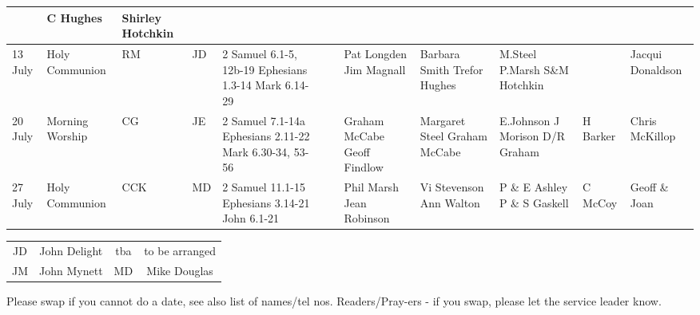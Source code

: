 \documentclass[10pt,a4paper]{article}
\begin{document}
\begin{center}
{\begin{tabular}{|p{1.6cm}|p{1.4cm}|p{1.0cm}|p{0.8cm}|p{3.2cm}|p{2cm}|p{1.5cm}|p{2cm}|p{1.8cm}|p{1.9cm}
|p{2cm}|p{1.6cm}|}
& C Hughes  & Shirley Hotchkin \\
\hline
13 July & Holy Communion
& RM & JD &    
2 Samuel 6.1-5, 12b-19 %
Ephesians 1.3-14 %
Mark 6.14-29
&   & 
 & Pat Longden  Jim Magnall & 
Barbara Smith Trefor Hughes &
M.Steel P.Marsh \linebreak S\&M Hotchkin
&   & Jacqui Donaldson \\
\hline
20 July & Morning Worship  
&  CG & JE & 
2 Samuel 7.1-14a \linebreak
Ephesians 2.11-22 \linebreak
Mark 6.30-34, 53-56
    & &
 &  Graham McCabe \linebreak Geoff Findlow & 
Margaret Steel \linebreak Graham McCabe &
E.Johnson   \linebreak J Morison  D/R Graham
& H Barker  &  Chris \linebreak McKillop \\
\hline
27 July & Holy Communion
 & CCK  & MD & 
2 Samuel 11.1-15  \linebreak
Ephesians 3.14-21 \linebreak
John 6.1-21 
    &   & 
 &  Phil Marsh \linebreak Jean Robinson & 
Vi Stevenson Ann Walton &
P \& E Ashley P \& S Gaskell
& C McCoy  &   Geoff \& Joan \\
\hline
\end{tabular}
}

\vspace{1em}
\begin{tabular}{|c|c|c|c|}\hline
JD & John Delight &  tba & to be arranged  \\ %
 JM & John Mynett & MD & Mike Douglas \\
   \hline
\end{tabular}
\end{center}
\vspace{1em}
Please swap if you cannot do a date, see also list of names/tel nos.
Readers/Pray-ers - if you swap, please let the service leader know.\\
\end{document}
